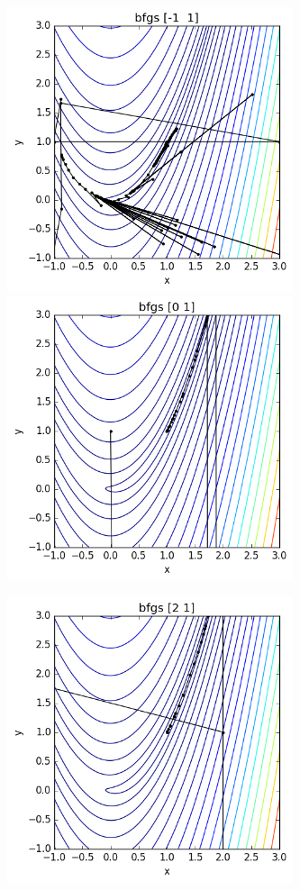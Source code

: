 \documentclass[11pt]{article}
\begin{document}
\begin{figure}[h!]
  \includegraphics[width=3.3in]{rosenbrock-bfgs-1.png}
  \includegraphics[width=3.3in]{rosenbrock-bfgs0.png}
\end{figure}

\begin{figure}[h!]
  \includegraphics[width=3.3in]{rosenbrock-bfgs2.png}
\end{figure}
\end{document}
